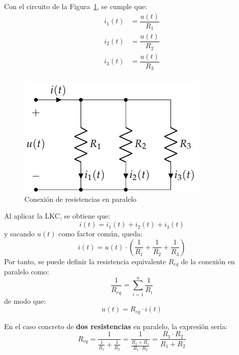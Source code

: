         Con el circuito de la Figura~\ref{fig:resistencias-paralelo},
        se cumple que:
        \begin{align*}
          i_1(t) &= \dfrac{u(t)}{R_1}\\
          i_2(t) &= \dfrac{u(t)}{R_2}\\
          i_3(t) &= \dfrac{u(t)}{R_3}\\
        \end{align*}
        \begin{figure}[H]
          \centering
          \includegraphics[width=0.35\linewidth]{../figs/AsociacionParalelo.pdf}
          \caption{Conexión de resistencias en paralelo}
          \label{fig:resistencias-paralelo}
        \end{figure}
        Al aplicar la LKC, se obtiene que:
        \begin{equation*}
          i(t) = i_1(t) + i_2(t) + i_3(t)
        \end{equation*}
        y sacando $u(t)$ como factor común, queda:
        \begin{equation*}
          i(t) = u(t) \cdot \left(\frac{1}{R_1} + \frac{1}{R_2} + \frac{1}{R_3}\right)
        \end{equation*}
        Por tanto, se puede definir la resistencia equivalente
        $R_{eq}$ de la conexión en paralelo como:
        \begin{equation}
          \boxed{\dfrac{1}{R_{eq}} = \sum_{i = 1}^n \dfrac{1}{R_i}}
        \end{equation}
        de modo que:
        \begin{equation*}
          u(t) = R_{eq} \cdot i(t)
        \end{equation*}
		
		\begin{remark}
                  En el caso concreto de \textbf{dos resistencias} en
                  paralelo, la expresión sería:
                  \begin{equation*}
                    R_{eq}=\dfrac{1}{\frac{1}{R_1}+\frac{1}{R_2}}=\dfrac{1}{\frac{R_2+R_1}{R_1\cdot R_2}}=\dfrac{R_1\cdot R_2}{R_1+R_2}
                  \end{equation*}
		\end{remark}
		
